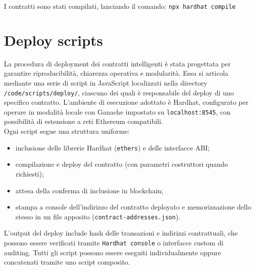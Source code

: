         \noindent I contratti sono stati compilati, lanciando il comando: \lstinline{npx hardhat compile}

    \section{Deploy scripts}
        La procedura di deployment dei contratti intelligenti è stata progettata per garantire riproducibilità, chiarezza operativa e modularità. Essa si articola mediante una serie di script in JavaScript localizzati nella directory \lstinline{/code/scripts/deploy/}, ciascuno dei quali è responsabile del deploy di uno specifico contratto. L'ambiente di esecuzione adottato è Hardhat, configurato per operare in modalità locale con Ganache impostato su \texttt{localhost:8545}, con possibilità di estensione a reti Ethereum compatibili. \\
        Ogni script segue una struttura uniforme:
            \begin{itemize}
                \item inclusione delle librerie Hardhat (\texttt{ethers}) e delle interfacce ABI;
                \item compilazione e deploy del contratto (con parametri costruttori quando richiesti);
                \item attesa della conferma di inclusione in blockchain;
                \item stampa a console dell'indirizzo del contratto deployato e memorizzazione dello stesso in un file apposito (\texttt{contract-addresses.json}).
            \end{itemize}
            
        \noindent L’output del deploy include hash delle transazioni e indirizzi contrattuali, che possono essere verificati tramite \texttt{Hardhat console} o interfacce custom di auditing. Tutti gli script possono essere eseguiti individualmente oppure concatenati tramite uno script composito.
                
